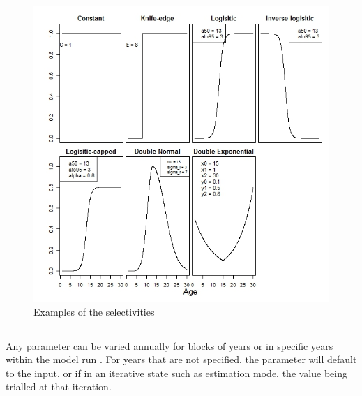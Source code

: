%
%

\begin{figure}[H]
	\includegraphics[scale = 0.7]{Figures/Selectivities.jpeg}
	\caption{Examples of the selectivities}
	\label{fig:select examples}
\end{figure}


\subsection{}\label{sec:TimeVarying} 

Any parameter can be varied annually for blocks of years or in specific years within the model run . For years that are not specified, the parameter will default to the input, or if in an iterative state such as estimation mode, the value being trialled at that iteration.

